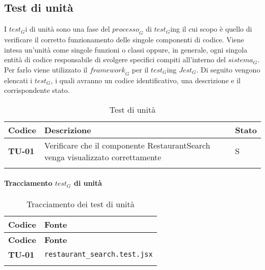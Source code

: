 \subsection{Test di unità}
I $\textit{test}_G$i di unità sono una fase del $\textit{processo}_G$ di $\textit{test}_G$ing il cui scopo è quello di verificare il corretto funzionamento delle singole componenti di codice. Viene intesa un'unità come singole funzioni o classi oppure, in generale, ogni singola entità di codice responsabile di svolgere specifici compiti all'interno del $\textit{sistema}_G$. Per farlo viene utilizzato il $\textit{framework}_G$ per il $\textit{test}_G$ing $\textit{Jest}_G$. Di seguito vengono elencati i $\textit{test}_G$, i quali avranno un codice identificativo, una descrizione e il corrispondente stato.
\begin{longtable}{|>{\centering\arraybackslash}p{1.5cm}|p{15cm}|p{1cm}|}
  \hline
  \rowcolor{gray!30}
  \textbf{Codice} & \textbf{Descrizione} & \textbf{Stato} \\
  \hline
  \rowcolor{gray!10}
  \textbf{TU-01} & Verificare che il componente RestaurantSearch venga visualizzato correttamente  & S \\
  \hline
  \caption{Test di unità} 
  \label{tab:test_unita}
  \end{longtable}
\paragraph{Tracciamento $\textit{test}_G$ di unità}
\begin{longtable}{|>{\centering\arraybackslash}p{2cm}|p{6cm}|}
  \hline
  \rowcolor{gray!30}
  \textbf{Codice} & \textbf{Fonte} \\
  \hline
  \endfirsthead

  \hline
  \rowcolor{gray!30}
  \textbf{Codice} & \textbf{Fonte} \\
  \hline
  \endhead

  \rowcolor{gray!10}
  \textbf{TU-01} & \texttt{restaurant\_search.test.jsx} \\
  \hline

  \caption{Tracciamento dei test di unità} 
  \label{tab:test_unita}
\end{longtable}
